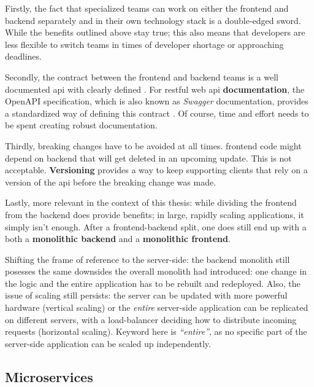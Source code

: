 Firstly, the fact that specialized teams can work on either the \gls{frontend}
and \gls{backend} separately and in their own technology stack is a double-edged
sword. While the benefits outlined above stay true; this also means that
developers are less flexible to switch teams in times of developer shortage or
approaching deadlines.

Secondly, the contract between the \gls{frontend} and \gls{backend} teams is a
well documented \gls{api} with clearly defined . For \gls{restful}
web \gls{api} \textbf{documentation}, the OpenAPI
specification, which is also known as
\textit{Swagger} documentation, provides a standardized way of defining this
contract \autocite{Koren_Klamma_2018}. Of course, time and effort needs to be
spent creating robust documentation. 

Thirdly, breaking changes have to be avoided at all times. \Gls{frontend} code
might depend on \gls{backend}  that will get deleted in an
upcoming update. This is not acceptable.
\textbf{Versioning} provides a
way to keep supporting clients that rely on a version of the \gls{api} before
the breaking change was made.

Lastly, more relevant in the context of this thesis: while dividing the
\gls{frontend} from the \gls{backend} does provide benefits; in large, rapidly
scaling applications, it simply isn't enough. After a
\gls{frontend}-\gls{backend} split, one does still end up with a both a
\textbf{\gls{monolithic} \gls{backend}} and a \textbf{\gls{monolithic}
\gls{frontend}}. 

Shifting the frame of reference to the server-side: the \gls{backend}
\gls{monolith} still posesses the same downsides the overall \gls{monolith} had
introduced: one change in the logic and the entire application has to be
rebuilt and redeployed. Also, the issue of scaling still persists: the server
can be updated with more powerful hardware (vertical scaling) or the \textit{entire}
server-side application can be replicated on different servers, with a
\gls{load-balancer} deciding how to distribute incoming requests (horizontal scaling).
Keyword here is \textit{``entire''}, as no specific part of the server-side
application can be scaled up independently. 


\subsection{Microservices} 
\label{ssec:microservices}

